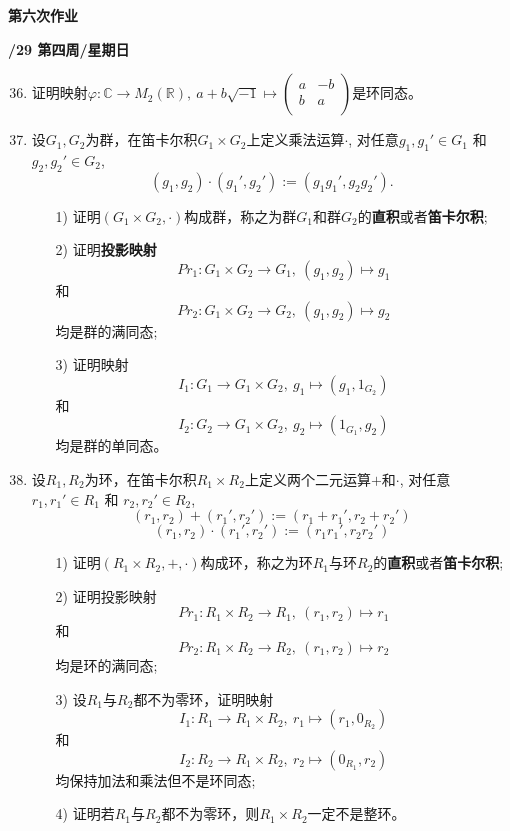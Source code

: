 \documentclass[a4paper,12pt]{article}
\begin{document}
\newpage
\head

 \begin{center} %
	{\Large \bf 第六次作业} %
	\vspace{2mm}
	
	{\bf{}/29 \quad  第四周/星期日} %
\end{center} 

  \begin{enumerate}\setcounter{enumi}{35}
     \item 证明映射$\varphi : \mathbb{C} \rightarrow M_2(\mathbb{R}), \ 
     a+b \sqrt{-1} \mapsto \begin{pmatrix} a & -b \\ b & a\\\end{pmatrix}$是环同态。

     \item 设$G_1, G_2$为群，在笛卡尔积$G_1 \times G_2$上定义乘法运算$\cdot$, 对任意$g_1,g_1'\in G_1$ 和 $g_2,g_2'\in G_2$,
     $$(g_1, g_2) \cdot (g_1', g_2') := (g_1g_1', g_2g_2').$$
     \begin{itemize}
         \item[1)] 证明$(G_1 \times G_2, \cdot)$构成群，称之为群$G_1$和群$G_2$的\textbf{直积}或者\textbf{笛卡尔积};
         \item[2)] 证明\textbf{投影映射}
         \[Pr_1:G_1 \times G_2 \rightarrow G_1, \ (g_1, g_2) \mapsto g_1\]
         和
         \[Pr_2:G_1 \times G_2 \rightarrow G_2, \ (g_1, g_2) \mapsto g_2\]
         均是群的满同态;
         \item[3)] 证明映射
         \[I_1:G_1 \rightarrow G_1 \times G_2, \ g_1 \mapsto (g_1, 1_{G_2})\]
         和
         \[I_2:G_2 \rightarrow G_1 \times G_2, \ g_2 \mapsto (1_{G_1}, g_2)\]
         均是群的单同态。
     \end{itemize}

     \item 设$R_1, R_2$为环，在笛卡尔积$R_1 \times R_2$上定义两个二元运算$+$和$\cdot$, 对任意$r_1,r_1'\in R_1$ 和 $r_2,r_2'\in R_2$,
     $$(r_1, r_2) + (r_1', r_2') := (r_1+r_1', r_2+r_2')$$
     $$(r_1, r_2) \cdot (r_1', r_2') := (r_1r_1', r_2r_2')$$
     \begin{itemize}
         \item[1)] 证明$(R_1 \times R_2, +, \cdot)$构成环，称之为环$R_1$与环$R_2$的\textbf{直积}或者\textbf{笛卡尔积};
         \item[2)] 证明投影映射
         \[Pr_1:R_1 \times R_2 \rightarrow R_1, \ (r_1, r_2) \mapsto r_1\]
         和
         \[Pr_2:R_1 \times R_2 \rightarrow R_2, \ (r_1, r_2) \mapsto r_2\]
         均是环的满同态;
         \item[3)] 设$R_1$与$R_2$都不为零环，证明映射
         \[I_1:R_1 \rightarrow R_1 \times R_2, \ r_1 \mapsto (r_1, 0_{R_2})\]
         和
         \[I_2:R_2 \rightarrow R_1 \times R_2, \ r_2 \mapsto (0_{R_1}, r_2)\]
         均保持加法和乘法但不是环同态;
         \item[4)] 证明若$R_1$与$R_2$都不为零环，则$R_1 \times R_2$一定不是整环。
     \end{itemize}


\end{enumerate}
\end{document}

